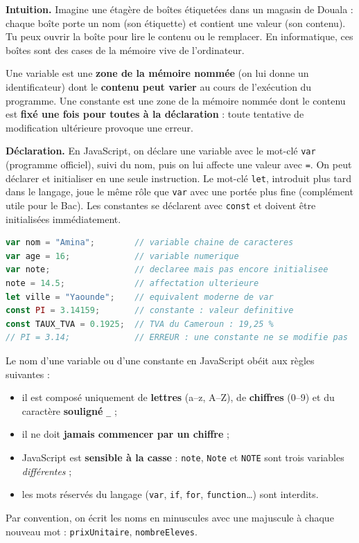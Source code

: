 \documentclass[11pt]{article}
\newcommand{\cle}[1]{{\popxbold\color{popdark}#1}}
\newcounter{popsec}
\newcounter{popsub}
\newcommand{\courssub}[1]{%
  \stepcounter{popsub}%
  \par\vspace{9pt}\noindent{\popxbold\fontsize{11.5}{13}\selectfont\color{popink}{\color{poporange}\thepopsec.\thepopsub}\hspace{6pt}#1}\par\nopagebreak\vspace{4pt}
}
\begin{document}
\courssub{Variables et constantes}

\textbf{Intuition.} Imagine une étagère de boîtes étiquetées dans un magasin de Douala : chaque boîte porte un nom (son étiquette) et contient une valeur (son contenu). Tu peux ouvrir la boîte pour lire le contenu ou le remplacer. En informatique, ces boîtes sont des cases de la mémoire vive de l'ordinateur.

\begin{definition}
Une \cle{variable} est une \textbf{zone de la mémoire nommée} (on lui donne un identificateur) dont le \textbf{contenu peut varier} au cours de l'exécution du programme. Une \cle{constante} est une zone de la mémoire nommée dont le contenu est \textbf{fixé une fois pour toutes à la déclaration} : toute tentative de modification ultérieure provoque une erreur.
\end{definition}

\textbf{Déclaration.} En JavaScript, on déclare une variable avec le mot-clé \texttt{var} (programme officiel), suivi du nom, puis on lui affecte une valeur avec \texttt{=}. On peut déclarer et initialiser en une seule instruction. Le mot-clé \texttt{let}, introduit plus tard dans le langage, joue le même rôle que \texttt{var} avec une portée plus fine (complément utile pour le Bac). Les constantes se déclarent avec \texttt{const} et doivent être initialisées immédiatement.

\begin{lstlisting}[language=JavaScript]
var nom = "Amina";        // variable chaine de caracteres
var age = 16;             // variable numerique
var note;                 // declaree mais pas encore initialisee
note = 14.5;              // affectation ulterieure
let ville = "Yaounde";    // equivalent moderne de var
const PI = 3.14159;       // constante : valeur definitive
const TAUX_TVA = 0.1925;  // TVA du Cameroun : 19,25 %
// PI = 3.14;             // ERREUR : une constante ne se modifie pas
\end{lstlisting}

\begin{propriete}
Le nom d'une variable ou d'une constante en JavaScript obéit aux règles suivantes :
\begin{itemize}
\item il est composé uniquement de \textbf{lettres} (a--z, A--Z), de \textbf{chiffres} (0--9) et du caractère \textbf{souligné} \texttt{\_} ;
\item il ne doit \textbf{jamais commencer par un chiffre} ;
\item JavaScript est \textbf{sensible à la casse} : \texttt{note}, \texttt{Note} et \texttt{NOTE} sont trois variables \emph{différentes} ;
\item les mots réservés du langage (\texttt{var}, \texttt{if}, \texttt{for}, \texttt{function}\ldots) sont interdits.
\end{itemize}
Par convention, on écrit les noms en minuscules avec une majuscule à chaque nouveau mot : \texttt{prixUnitaire}, \texttt{nombreEleves}.
\end{propriete}
\end{document}
